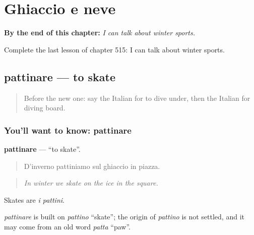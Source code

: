 
\chapter{Ghiaccio e neve}
\label{ch:it-ghiaccio-e-neve}

\begin{chapteropening}
\textbf{By the end of this chapter:} \emph{I can talk about winter sports.}

Complete the last lesson of chapter 515: I can talk about winter sports.
\end{chapteropening}

\section[pattinare]{pattinare — to skate}

\label{lesson:IT-C515-pattinare}



\begin{quote}
Before the new one: say the Italian for to dive under, then the Italian for diving board.
\end{quote}

\subsection*{You'll want to know: pattinare}
\textbf{pattinare} — \textquotedblleft{}to skate\textquotedblright{}.

\begin{quote}
D'inverno pattiniamo sul ghiaccio in piazza.
\end{quote}

\begin{quote}
\emph{In winter we skate on the ice in the square.}
\end{quote}

Skates are \emph{i pattini}.

\begin{cousinweb}
\emph{pattinare} is built on \emph{pattino} \textquotedblleft{}skate\textquotedblright{}; the origin of \emph{pattino} is not settled, and it may come from an old word \emph{patta} \textquotedblleft{}paw\textquotedblright{}.
\end{cousinweb}

